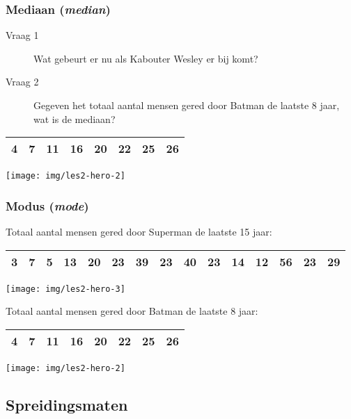 \documentclass[aspectratio=169]{beamer}
\begin{document}
\begin{frame}
  \frametitle{Mediaan (\emph{median})}

  \begin{description}
    \item[Vraag 1] Wat gebeurt er nu als Kabouter Wesley er bij komt?
    \item[Vraag 2] Gegeven het totaal aantal mensen gered door Batman de laatste 8 jaar, wat is de mediaan?
  \end{description}

    \centering
    \begin{tabular}{|c|c|c|c|c|c|c|c|}
      \hline
      4 & 7 & 11 & 16 & 20 & 22 & 25 & 26 \\
      \hline
    \end{tabular}
    \texttt{[image: img/les2-hero-2]}
\end{frame}

\begin{frame}
  \frametitle{Modus (\emph{mode})}


  Totaal aantal mensen gered door Superman de laatste 15 jaar:

   \begin{center}
    \begin{tabular}{|c|c|c|c|c|c|c|c|c|c|c|c|c|c|c|}
      \hline
      3&7&5&13&20&23&39&23&40&23&14&12&56&23&29\\
      \hline
    \end{tabular}
    \texttt{[image: img/les2-hero-3]}
  \end{center}


  Totaal aantal mensen gered door Batman de laatste 8 jaar:
  \begin{center}
    \begin{tabular}{|c|c|c|c|c|c|c|c|}
      \hline
      4 & 7 & 11 & 16 & 20 & 22 & 25 & 26 \\
      \hline
    \end{tabular}
    \texttt{[image: img/les2-hero-2]}
  \end{center}

\end{frame}

\subsection{Spreidingsmaten}
\end{document}
